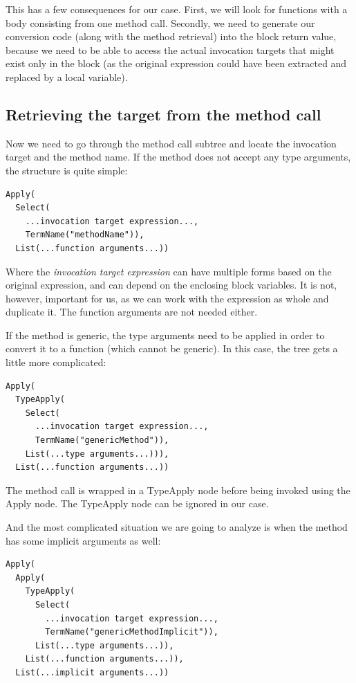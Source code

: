 This has a few consequences for our case. First, we will look for functions with a body consisting from one method call. Secondly, we need to generate our conversion code (along with the method retrieval) into the block return value, because we need to be able to access the actual invocation targets that might exist only in the block (as the original expression could have been extracted and replaced by a local variable). 

\subsection{Retrieving the target from the method call}

Now we need to go through the method call subtree and locate the invocation target and the method name. If the method does not accept any type arguments, the structure is quite simple:

\lstset{style=Dump}
\begin{lstlisting}
Apply(
  Select(
    ...invocation target expression..., 
    TermName("methodName")), 
  List(...function arguments...))
\end{lstlisting}

Where the \textit{invocation target expression} can have multiple forms based on the original expression, and can depend on the enclosing block variables. It is not, however, important for us, as we can work with the expression as whole and duplicate it. The function arguments are not needed either.

If the method is generic, the type arguments need to be applied in order to convert it to a function (which cannot be generic). In this case, the tree gets a little more complicated:

\lstset{style=Dump}
\begin{lstlisting}
Apply(
  TypeApply(
    Select(
      ...invocation target expression..., 
      TermName("genericMethod")), 
    List(...type arguments...))), 
  List(...function arguments...))
\end{lstlisting}

The method call is wrapped in a TypeApply node before being invoked using the Apply node. The TypeApply node can be ignored in our case.

And the most complicated situation we are going to analyze is when the method has some implicit arguments as well:

\lstset{style=Dump}
\begin{lstlisting}
Apply(
  Apply(
    TypeApply(
      Select(
        ...invocation target expression...,
        TermName("genericMethodImplicit")), 
      List(...type arguments...)), 
    List(...function arguments...)), 
  List(...implicit arguments...))
\end{lstlisting}

